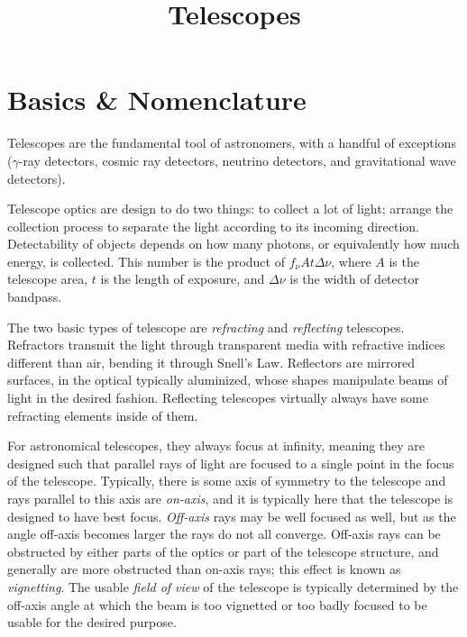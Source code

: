 \title{\bf Telescopes}

\section{Basics \& Nomenclature}

Telescopes are the fundamental tool of astronomers, with a handful of
exceptions ($\gamma$-ray detectors, cosmic ray detectors, neutrino
detectors, and gravitational wave detectors). 

Telescope optics are design to do two things: to collect a lot of
light; arrange the collection process to separate the light according
to its incoming direction. Detectability of objects depends on how
many photons, or equivalently how much energy, is collected. This
number is the product of $f_\nu A t \Delta\nu$, where $A$ is the
telescope area, $t$ is the length of exposure, and $\Delta\nu$ is the
width of detector bandpass.

The two basic types of telescope are {\it refracting} and {\it
reflecting} telescopes. Refractors transmit the light through
transparent media with refractive indices different than air, bending
it through Snell's Law. Reflectors are mirrored surfaces, in the
optical typically aluminized, whose shapes manipulate beams of light
in the desired fashion. Reflecting telescopes virtually always have
some refracting elements inside of them.

For astronomical telescopes, they always focus at infinity, meaning
they are designed such that parallel rays of light are focused to a
single point in the focus of the telescope.  Typically, there is some
axis of symmetry to the telescope and rays parallel to this axis are
{\it on-axis}, and it is typically here that the telescope is designed
to have best focus. {\it Off-axis} rays may be well focused as well,
but as the angle off-axis becomes larger the rays do not all
converge. Off-axis rays can be obstructed by either parts of the
optics or part of the telescope structure, and generally are more
obstructed than on-axis rays; this effect is known as {\it
vignetting}.  The usable {\it field of view} of the telescope is
typically determined by the off-axis angle at which the beam is too
vignetted or too badly focused to be usable for the desired purpose.


